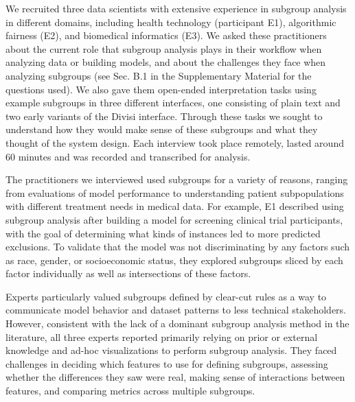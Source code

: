 We recruited three data scientists with extensive experience in subgroup analysis in different domains, including health technology (participant E1), algorithmic fairness (E2), and biomedical informatics (E3).
We asked these practitioners about the current role that subgroup analysis plays in their workflow when analyzing data or building models, and about the challenges they face when analyzing subgroups (see Sec. B.1 in the Supplementary Material for the questions used).
We also gave them open-ended interpretation tasks using example subgroups in three different interfaces, one consisting of plain text and two early variants of the Divisi interface.
Through these tasks we sought to understand how they would make sense of these subgroups and what they thought of the system design.
Each interview took place remotely, lasted around 60 minutes and was recorded and transcribed for analysis.

The practitioners we interviewed used subgroups for a variety of reasons, ranging from evaluations of model performance to understanding patient subpopulations with different treatment needs in medical data.
For example, E1 described using subgroup analysis after building a model for screening clinical trial participants, with the goal of determining what kinds of instances led to more predicted exclusions.
To validate that the model was not discriminating by any factors such as race, gender, or socioeconomic status, they explored subgroups sliced by each factor individually as well as intersections of these factors.

Experts particularly valued subgroups defined by clear-cut rules as a way to communicate model behavior and dataset patterns to less technical stakeholders.
However, consistent with the lack of a dominant subgroup analysis method in the literature, all three experts reported primarily relying on prior or external knowledge and ad-hoc visualizations to perform subgroup analysis.
They faced challenges in deciding which features to use for defining subgroups, assessing whether the differences they saw were real, making sense of interactions between features, and comparing metrics across multiple subgroups.

